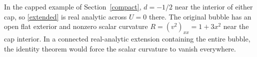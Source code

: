 \documentclass[12pt]{article}
\begin{document}
In the capped example of Section~\ref{compact}, \(d=-1/2\) near the
interior of either cap, so \eqref{extended} is real analytic across
\(U=0\) there. The original bubble has an open flat exterior and nonzero
scalar curvature \(R=(v^2)_{xx}=1+3x^2\) near the cap interior. In a
connected real-analytic extension containing the entire bubble, the
identity theorem would force the scalar curvature to vanish everywhere.

{\small\raggedright


}
\end{document}
